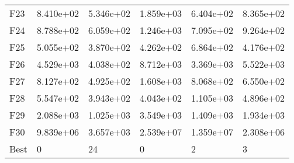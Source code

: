 \begin{tabular}{llllll}
F23  &  8.410e+02 &  5.346e+02 &  1.859e+03 &  6.404e+02 &  8.365e+02 \\
F24  &  8.788e+02 &  6.059e+02 &  1.246e+03 &  7.095e+02 &  9.264e+02 \\
F25  &  5.055e+02 &  3.870e+02 &  4.262e+02 &  6.864e+02 &  4.176e+02 \\
F26  &  4.529e+03 &  4.038e+02 &  8.712e+03 &  3.369e+03 &  5.522e+03 \\
F27  &  8.127e+02 &  4.925e+02 &  1.608e+03 &  8.068e+02 &  6.550e+02 \\
F28  &  5.547e+02 &  3.943e+02 &  4.043e+02 &  1.105e+03 &  4.896e+02 \\
F29  &  2.088e+03 &  1.025e+03 &  3.549e+03 &  1.409e+03 &  1.934e+03 \\
F30  &  9.839e+06 &  3.657e+03 &  2.539e+07 &  1.359e+07 &  2.308e+06 \\
Best &          0 &         24 &          0 &          2 &          3 \\
\bottomrule
\end{tabular}
